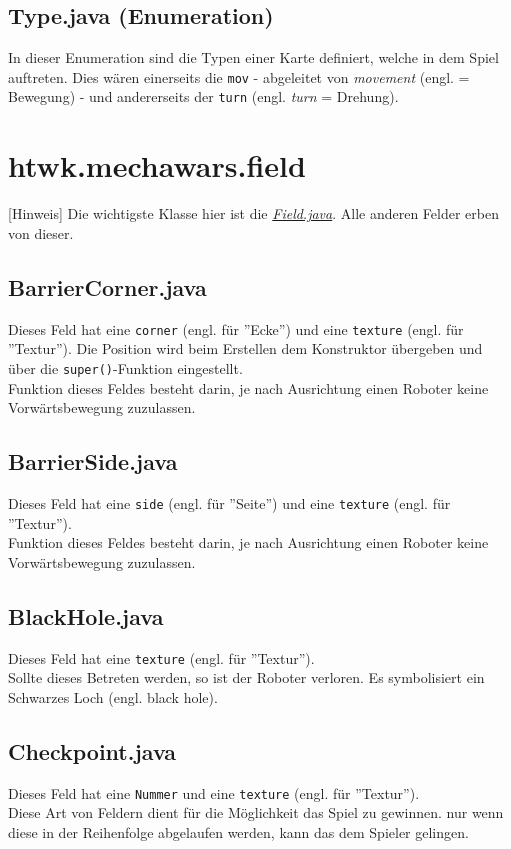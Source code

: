 \documentclass[12pt,a4paper,oneside]{book}
\theoremstyle{plain}
\numberwithin{equation}{chapter} \DeclareMathOperator{\Var}{Var}
\begin{document}
\hypertarget{Type.java}{}  
\subsection{Type.java (Enumeration)}
    In dieser Enumeration sind die Typen einer Karte definiert, welche in dem Spiel auftreten. Dies wären einerseits die \texttt{mov} - abgeleitet von \textit{movement} (engl. = Bewegung) - und andererseits der \texttt{turn} (engl. \textit{turn} = Drehung).

\newpage
\section{htwk.mechawars.field}
    [Hinweis] Die wichtigste Klasse hier ist die \hyperlink{Field.java}{\textit{Field.java}}. Alle anderen Felder erben von dieser.
\subsection{BarrierCorner.java}
    Dieses Feld hat eine \texttt{corner} (engl. für ''Ecke'') und eine \texttt{texture} (engl. für ''Textur''). Die Position wird beim Erstellen dem Konstruktor übergeben und über die \texttt{super()}-Funktion eingestellt. \\
    Funktion dieses Feldes besteht darin, je nach Ausrichtung einen Roboter keine Vorwärtsbewegung zuzulassen.
    
\subsection{BarrierSide.java}
    Dieses Feld hat eine \texttt{side} (engl. für ''Seite'') und eine \texttt{texture} (engl. für ''Textur''). \\
    Funktion dieses Feldes besteht darin, je nach Ausrichtung einen Roboter keine Vorwärtsbewegung zuzulassen.
    
\subsection{BlackHole.java}
    Dieses Feld hat eine  \texttt{texture} (engl. für ''Textur''). \\
    Sollte dieses Betreten werden, so ist der Roboter verloren. Es symbolisiert ein Schwarzes Loch (engl. black hole).

\subsection{Checkpoint.java}
    Dieses Feld hat eine \texttt{Nummer} und eine \texttt{texture} (engl. für ''Textur''). \\
    Diese Art von Feldern dient für die Möglichkeit das Spiel zu gewinnen. nur wenn diese in der Reihenfolge abgelaufen werden, kann das dem Spieler gelingen.
\end{document}
